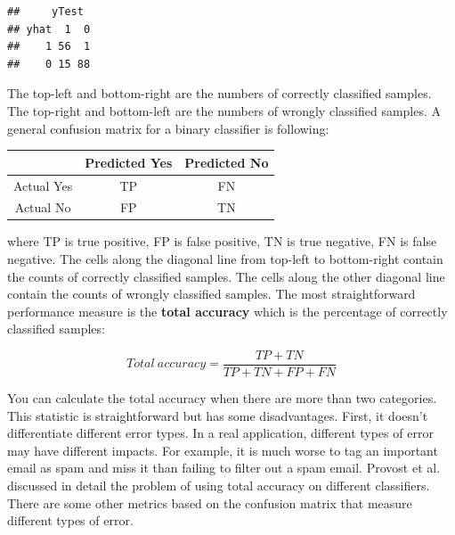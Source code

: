 \documentclass[12pt,]{krantz}
\makeatletter
\newenvironment{Shaded}{\begin{snugshade}}{\end{snugshade}}
\newcommand{\KeywordTok}[1]{\textcolor[rgb]{0.27,0.27,0.27}{\textbf{#1}}}
\newcommand{\NormalTok}[1]{#1}
\newcommand{\OperatorTok}[1]{\textcolor[rgb]{0.43,0.43,0.43}{\textbf{#1}}}
\newcommand{\StringTok}[1]{\textcolor[rgb]{0.5,0.5,0.5}{#1}}
\newenvironment{kframe}{%
\medskip{}
\setlength{\fboxsep}{.8em}
 \def\at@end@of@kframe{}%
 \ifinner\ifhmode%
  \def\at@end@of@kframe{\end{minipage}}%
  \begin{minipage}{\columnwidth}%
 \fi\fi%
 \def\FrameCommand##1{\hskip\@totalleftmargin \hskip-\fboxsep
 \colorbox{shadecolor}{##1}\hskip-\fboxsep
     \hskip-\linewidth \hskip-\@totalleftmargin \hskip\columnwidth}%
 \MakeFramed {\advance\hsize-\width
   \@totalleftmargin\z@ \linewidth\hsize
   \@setminipage}}%
 {\par\unskip\endMakeFramed%
 \at@end@of@kframe}
\renewenvironment{Shaded}{\begin{kframe}}{\end{kframe}}
\makeatother
\begin{document}
\begin{Shaded}
\end{Shaded}

\begin{verbatim}
##     yTest
## yhat  1  0
##    1 56  1
##    0 15 88
\end{verbatim}

The top-left and bottom-right are the numbers of correctly classified samples. The top-right and bottom-left are the numbers of wrongly classified samples. A general confusion matrix for a binary classifier is following:

\begin{longtable}[]{@{}ccc@{}}
\toprule
& Predicted Yes & Predicted No\tabularnewline
\midrule
\endhead
Actual Yes & TP & FN\tabularnewline
Actual No & FP & TN\tabularnewline
\bottomrule
\end{longtable}

where TP is true positive, FP is false positive, TN is true negative, FN is false negative. The cells along the diagonal line from top-left to bottom-right contain the counts of correctly classified samples. The cells along the other diagonal line contain the counts of wrongly classified samples. The most straightforward performance measure is the \textbf{total accuracy} which is the percentage of correctly classified samples:

\[Total\ accuracy = \frac{TP+TN}{TP+TN+FP+FN}\]

You can calculate the total accuracy when there are more than two categories. This statistic is straightforward but has some disadvantages. First, it doesn't differentiate different error types. In a real application, different types of error may have different impacts. For example, it is much worse to tag an important email as spam and miss it than failing to filter out a spam email. Provost et al. \citep{Provost1998} discussed in detail the problem of using total accuracy on different classifiers. There are some other metrics based on the confusion matrix that measure different types of error.
\end{document}
